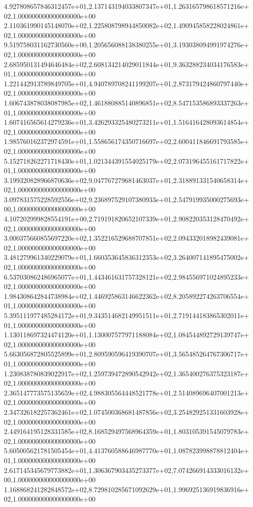 4.927808657846312457e+01,2.137143194033807347e+01,1.263165798618571216e+02,1.000000000000000000e+00
2.110361990145148070e+02,1.225808798944850082e+02,1.490945858228024861e+02,1.000000000000000000e+00
9.519758031162730560e+00,1.205656088138380255e+01,3.193038094991974276e+02,1.000000000000000000e+00
2.685950131494646484e+02,2.608134214029011844e+01,9.363288234034176583e+01,1.000000000000000000e+00
1.221442913789849705e+01,4.940789708241199207e+01,2.873179424860797440e+02,1.000000000000000000e+00
1.606743878038087985e+02,1.461880885140896851e+02,8.547153586893337263e+01,1.000000000000000000e+00
1.607416565614279236e+01,3.426293325480273211e+01,1.516416428093614854e+02,1.000000000000000000e+00
1.985760162372974591e+01,1.558656174350716697e+02,2.600411846691793585e+02,1.000000000000000000e+00
5.152718262271718430e+01,1.021344391554025179e+02,2.073196455161717822e+01,1.000000000000000000e+00
3.199320828966870636e+02,9.047767279681463037e+01,2.318891331540658314e+02,1.000000000000000000e+00
3.097831575228592556e+02,9.236897529107380933e+01,2.547919935000275693e+00,1.000000000000000000e+00
4.107202999828554191e+00,2.719191820652107339e+01,2.908220353128470492e+02,1.000000000000000000e+00
3.000375660855697220e+02,1.352216529688707851e+02,2.094332018982439081e+02,1.000000000000000000e+00
3.481279961340229079e+01,1.660353645836312353e+02,3.264007141895475002e+02,1.000000000000000000e+00
6.537030862486965077e+01,1.443461631757328121e+02,2.984556971024895233e+02,1.000000000000000000e+00
1.984308642844738984e+02,1.446925863146622362e+02,8.205892274263706554e+01,1.000000000000000000e+00
5.395111977485284172e+01,9.343514682149951511e+01,2.719144183865302011e+01,1.000000000000000000e+00
1.130118697324474120e+01,1.130007577971188084e+02,1.084544892729139747e+02,1.000000000000000000e+00
5.663056872805525899e+01,2.809590596419390707e+01,3.565485264767306717e+01,1.000000000000000000e+00
1.230838780839022917e+02,1.259739472890542942e+02,1.365400276375323187e+02,1.000000000000000000e+00
2.365147773575135659e+02,4.988305564448521778e+01,2.514089696407001213e+02,1.000000000000000000e+00
2.347326182257362461e+02,1.074500368681487856e+02,3.254829251331603928e+02,1.000000000000000000e+00
2.449164195128331585e+02,8.168529497568964359e+01,1.803105391545079783e+02,1.000000000000000000e+00
5.605005621781505454e+01,4.413760588646987770e+01,1.087823998878812404e+01,1.000000000000000000e+00
2.617145345679773882e+01,1.306367903435273377e+02,7.074266914333016132e+00,1.000000000000000000e+00
1.168868241282848572e+02,8.729810285671092629e+01,1.996925136919836916e+02,1.000000000000000000e+00
